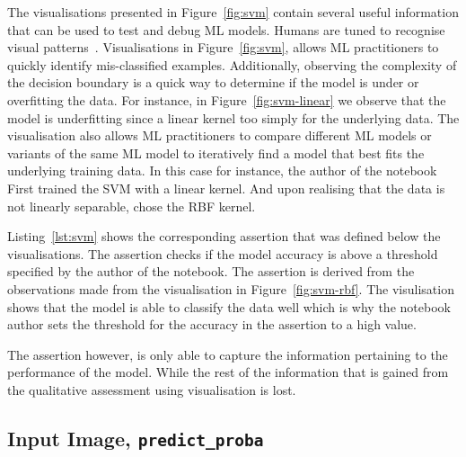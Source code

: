 \documentclass[acmsmall,screen,review,anonymous]{acmart}
\begin{document}

The visualisations presented in Figure~\ref{fig:svm} contain several useful information that can be used to test and debug ML models. Humans are tuned to recognise visual patterns~\cite{CITEME}. Visualisations in Figure~\ref{fig:svm}, allows ML practitioners to quickly identify mis-classified examples. Additionally, observing the complexity of the decision boundary is a quick way to determine if the model is under or overfitting the data. For instance, in Figure~\ref{fig:svm-linear} we observe that the model is underfitting since a linear kernel too simply for the underlying data. The visualisation also allows ML practitioners to compare different ML models or variants of the same ML model to iteratively find a model that best fits the underlying training data. In this case for instance, the author of the notebook First trained the SVM with a linear kernel. And upon realising that the data is not linearly separable, chose the RBF kernel.

Listing~\ref{lst:svm} shows the corresponding assertion that was defined below the visualisations. The assertion checks if the model accuracy is above a threshold specified by the author of the notebook. The assertion is derived from the observations made from the visualisation in Figure~\ref{fig:svm-rbf}. The visulisation shows that the model is able to classify the data well which is why the notebook author sets the threshold for the accuracy in the assertion to a high value.

The assertion however, is only able to capture the information pertaining to the performance of the model. While the rest of the information that is gained from the qualitative assessment using visualisation is lost.

\subsection{Input Image, \texttt{predict\_proba}}
\end{document}
